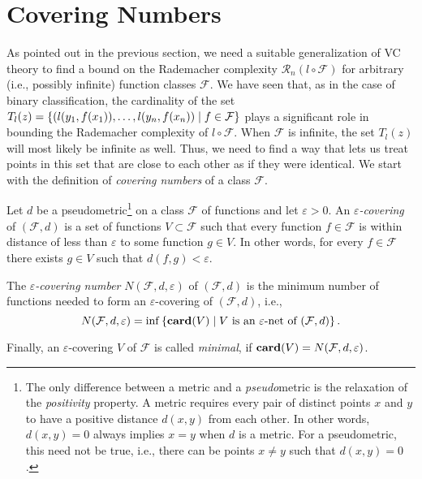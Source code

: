 \section{Covering Numbers}

As pointed out in the previous section, we need a suitable generalization of VC theory to find a bound on the Rademacher complexity $\mathcal{R}_n(l \circ \mathcal{F})$ for arbitrary (i.e., possibly infinite) function classes $\mathcal{F}$. We have seen that, as in the case of binary classification, the cardinality of the set $T_l(z) = \left\{(l(y_1, f(x_1)), \dots, l(y_n, f(x_n)) \mathrel{|} f \in \mathcal{F}\right\}$ plays a significant role in bounding the Rademacher complexity of $l \circ \mathcal{F}$. When $\mathcal{F}$ is infinite, the set $T_l(z)$ will  most likely be infinite as well. Thus, we need to find a way that lets us treat points in this set that are close to each other as if they were identical. We start with the definition of \emph{covering numbers} of a class $\mathcal{F}$.

\begin{definition}
Let $d$ be a pseudometric\footnote{The only difference between a metric and a \emph{pseudo}metric is the relaxation of the \emph{positivity} property. A metric requires every pair of distinct points $x$ and $y$ to have a positive distance $d(x, y)$ from each other. In other words, $d(x, y) = 0$ always implies $x = y$ when $d$ is a metric. For a pseudometric, this need not be true, i.e., there can be points $x \neq y$ such that $d(x, y) = 0$.} on a class $\mathcal{F}$ of functions and let $\varepsilon > 0$. An \emph{$\varepsilon$-covering} of $(\mathcal{F}, d)$ is a set of functions $V \subset \mathcal{F}$ such that every function $f \in \mathcal{F}$ is within distance of less than $\varepsilon$ to some function $g \in V$. In other words, for every $f \in \mathcal{F}$ there exists $g \in V$ such that $d(f, g) < \varepsilon$.

The \emph{$\varepsilon$-covering number} $N(\mathcal{F}, d, \varepsilon)$ of $(\mathcal{F}, d)$ is the minimum number of functions needed to form an $\varepsilon$-covering of $(\mathcal{F}, d)$, i.e.,
\[
    N(\mathcal{F}, d, \varepsilon) = \inf\left\{\mathrm{\mathbf{card}}(V) \mathrel{|} V \text{ is an } \varepsilon \text{-net of } (\mathcal{F}, d)\right\}.
\]

Finally, an $\varepsilon$-covering $V$ of $\mathcal{F}$ is called \emph{minimal}, if $\mathrm{\mathbf{card}}(V) = N(\mathcal{F}, d, \varepsilon)$.
\end{definition}

